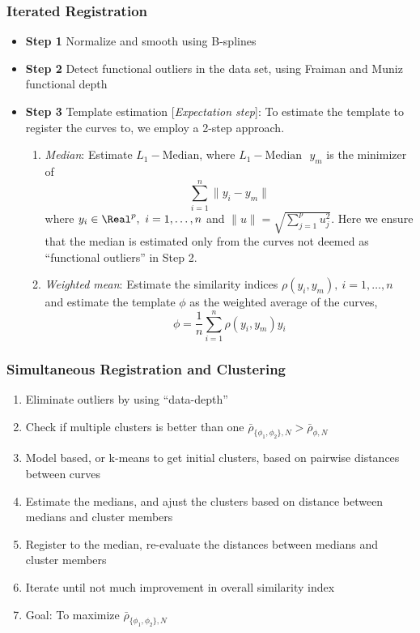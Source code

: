 \documentclass[10pt,dvipsnames,table]{beamer}
\begin{document}
\begin{frame}
\frametitle{Iterated Registration}
\begin{itemize}
\item {\bf{Step 1}} Normalize and smooth using B-splines
\item {\bf{Step 2}} Detect functional outliers in the data set, using Fraiman and Muniz functional depth
\item {\bf{Step 3}} Template estimation [{\emph{Expectation step}}]: To estimate the template to register the curves to, we employ a 2-step approach. 
\begin{enumerate}
\item {\emph{Median}}: Estimate $L_1-\text{Median}$, where $L_1-\text{Median }$ $y_m$ is the minimizer of 
\[ \sum\limits_{i = 1}^n \|y_i - y_m \| \]
where $y_i \in \Real^p, \ i = 1,\dots,n$ and $\|u \| = \sqrt{\sum\limits_{j = 1}^p u_j^2}$. Here we ensure that the median is estimated only from the curves not deemed as ``functional outliers'' in Step 2. 
\item {\emph{Weighted mean}}: Estimate the similarity indices $\rho(y_i, y_m), \ i = 1,\dots,n$ and estimate the template $\phi$ as the weighted average of the curves, 
\[ \phi = \frac{1}{n}\sum\limits_{i = 1}^n \rho(y_i, y_m) y_i \]
\end{enumerate}
\end{itemize}
\end{frame}


\begin{frame}
\frametitle{Simultaneous Registration and Clustering}
\begin{enumerate}
\item Eliminate outliers by using ``data-depth''
\item Check if multiple clusters is better than one $\bar{\rho}_{\{\phi_1, \phi_2\}, N} > \bar{\rho}_{\phi, N}$
\item Model based, or k-means to get initial clusters, based on pairwise distances between curves
\item Estimate the medians, and ajust the clusters based on distance between medians and cluster members
\item Register to the median, re-evaluate the distances between medians and cluster members
\item Iterate until not much improvement in overall similarity index
\item Goal: To maximize $\bar{\rho}_{\{\phi_1, \phi_2\}, N}$
\end{enumerate}
\end{frame}
\end{document}
